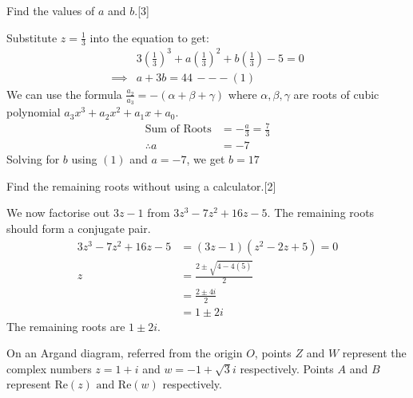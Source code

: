 \documentclass[12pt, a4 paper]{article}
\begin{document}
\begin{outline}[enumerate]
	\2 Find the values of $a$ and $b$.\hfill[3]
	\begin{answer}
		Substitute $z=\frac{1}{3}$ into the equation to get: 
		\begin{align*}
			         & 3\left(\frac{1}{3}\right)^3+a\left(\frac{1}{3}\right)^2+b\left(\frac{1}{3}\right)-5=0 \\
			\implies & a+3b=44\,---(1)                                                                       
		\end{align*}
		We can use the formula $\frac{a_2}{a_3}=-(\alpha + \beta + \gamma)$ where $\alpha,\beta,\gamma$ are roots of cubic polynomial $a_3x^3+a_2x^2+a_1x+a_0$.
		\begin{align*}
			\textrm{Sum of Roots} & =-\frac{a}{3} = \frac{7}{3} \\
			\therefore a          & = -7                        
		\end{align*}
		Solving for $b$ using $(1)$ and $a=-7$, we get $b=17$
	\end{answer}
		        
	\2 Find the remaining roots without using a calculator.\hfill[2]
	\begin{answer}
		We now factorise out $3z-1$ from $3z^3-7z^2+16z-5$. The remaining roots should form a conjugate pair.
		\begin{align*}
			3z^3-7z^2+16z-5 & = (3z-1)(z^2-2z+5)=0           \\
			z               & = \frac{2\pm \sqrt{4-4(5)}}{2} \\
			                & = \frac{2\pm 4i}{2}            \\
			                & = 1\pm 2i                      
		\end{align*}
		The remaining roots are $1\pm2i$.
	\end{answer}
		            
	\1 On an Argand diagram, referred from the origin $O$, points $Z$ and $W$ represent the complex numbers $z=1+i$ and $w=-1+\sqrt{3}i$ respectively. Points $A$ and $B$ represent $\textrm{Re}(z) \textrm{ and } \textrm{Re}(w)$ respectively. %
		    

\end{outline}
\end{document}
